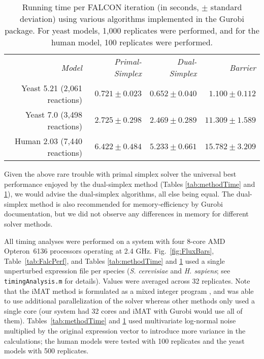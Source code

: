 \begin{table}
\begin{center}
\begin{tabular}{rrrr}
\emph{Model}                 & \emph{Primal-Simplex} & \emph{Dual-Simplex} & \emph{Barrier} \\
Yeast 5.21 (2,061 reactions) & $ 0.721 \pm 0.023 $ & $ 0.652 \pm 0.040 $ & $ 1.100 \pm 0.112  $\\ 
Yeast 7.0 (3,498 reactions)  & $ 2.725 \pm 0.298 $ & $ 2.469 \pm 0.289 $ & $ 11.309 \pm 1.589 $\\
Human 2.03 (7,440 reactions) & $ 6.422 \pm 0.484 $ & $ 5.233 \pm 0.661 $ & $ 15.782 \pm 3.209 $\\ 
\end{tabular}
\end{center}
\caption{Running time per FALCON iteration (in seconds, $\pm$ standard
  deviation) using various algorithms implemented in the Gurobi
  package.  For yeast models, 1,000 replicates were performed, and for
  the human model, 100 replicates were performed.}
\label{tab:methodTimeIter}
\end{table}

Given the above rare trouble with primal simplex solver the universal
best performance enjoyed by the dual-simplex method (\suppOrApp Tables
\ref{tab:methodTime} and \ref{tab:methodTimeIter}), we would advise
the dual-simplex algorithms, all else being equal. The dual-simplex
method is also recommended for memory-efficiency by Gurobi
documentation, but we did not observe any differences in memory for
different solver methods.

All timing analyses were performed on a system with four 8-core AMD
Opteron\texttrademark\ 6136 processors operating at 2.4
GHz. Fig.~\ref{fig:FluxBars}, Table~\ref{tab:FalcPerf}, and \suppOrApp
Tables \ref{tab:methodTime} and \ref{tab:methodTimeIter} used a single
unperturbed expression file per species (\textit{S. cerevisiae} and
\textit{H. sapiens}; see \texttt{timingAnalysis.m} for
details). Values were averaged across 32 replicates. \suppOrApp
Note that the iMAT method is formulated as a mixed integer program
\citep{Shlomi2008}, and was able to use additional parallelization of
the solver \citep{gurobi} whereas other methods only used a single
core (our system had 32 cores and iMAT with Gurobi would use all of
them). Tables~\ref{tab:methodTime} and \ref{tab:methodTimeIter} used
multivariate log-normal noise multiplied by the original expression
vector to introduce more variance in the calculations; the human
models were tested with 100 replicates and the yeast models with 500
replicates.

